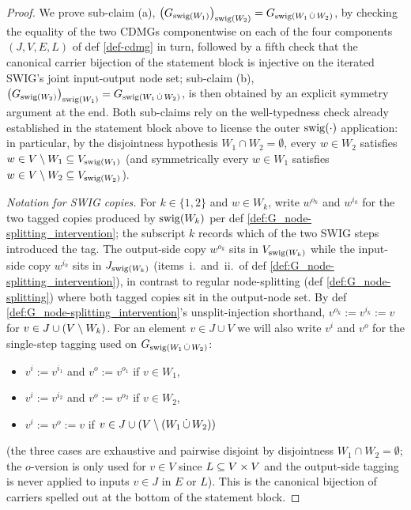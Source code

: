 \documentclass[main]{subfiles}
\begin{document}
\begin{proof}
We prove sub-claim (a), $\left ( G_{\mathrm{swig}(W_1)} \right )_{\mathrm{swig}(W_2)} = G_{\mathrm{swig}(W_1 \,\dot{\cup}\, W_2)}$, by checking the equality of the two CDMGs componentwise on each of the four components $(J, V, E, L)$ of def \ref{def-cdmg} in turn, followed by a fifth check that the canonical carrier bijection of the statement block is injective on the iterated SWIG's joint input-output node set; sub-claim (b), $\left ( G_{\mathrm{swig}(W_2)} \right )_{\mathrm{swig}(W_1)} = G_{\mathrm{swig}(W_1 \,\dot{\cup}\, W_2)}$, is then obtained by an explicit symmetry argument at the end. Both sub-claims rely on the well-typedness check already established in the statement block above to license the outer $\mathrm{swig}(\cdot)$ application: in particular, by the disjointness hypothesis $W_1 \cap W_2 = \emptyset$, every $w \in W_2$ satisfies $w \in V \setminus W_1 \subseteq V_{\mathrm{swig}(W_1)}$ (and symmetrically every $w \in W_1$ satisfies $w \in V \setminus W_2 \subseteq V_{\mathrm{swig}(W_2)}$).

\smallskip\noindent\emph{Notation for SWIG copies.}
For $k \in \{1, 2\}$ and $w \in W_k$, write $w^{o_k}$ and $w^{i_k}$ for the two tagged copies produced by $\mathrm{swig}(W_k)$ per def \ref{def:G_node-splitting_intervention}; the subscript $k$ records which of the two SWIG steps introduced the tag. The output-side copy $w^{o_k}$ sits in $V_{\mathrm{swig}(W_k)}$ while the input-side copy $w^{i_k}$ sits in $J_{\mathrm{swig}(W_k)}$ (items~i.\ and~ii.\ of def \ref{def:G_node-splitting_intervention}), in contrast to regular node-splitting (def \ref{def:G_node-splitting}) where both tagged copies sit in the output-node set. By def \ref{def:G_node-splitting_intervention}'s unsplit-injection shorthand, $v^{o_k} := v^{i_k} := v$ for $v \in J \cup (V \setminus W_k)$. For an element $v \in J \cup V$ we will also write $v^i$ and $v^o$ for the single-step tagging used on $G_{\mathrm{swig}(W_1 \,\dot{\cup}\, W_2)}$:
\begin{itemize}
    \item $v^i := v^{i_1}$ and $v^o := v^{o_1}$ if $v \in W_1$,
    \item $v^i := v^{i_2}$ and $v^o := v^{o_2}$ if $v \in W_2$,
    \item $v^i := v^o := v$ if $v \in J \cup (V \setminus (W_1 \,\dot{\cup}\, W_2))$
\end{itemize}
(the three cases are exhaustive and pairwise disjoint by disjointness $W_1 \cap W_2 = \emptyset$; the $o$-version is only used for $v \in V$ since $L \subseteq V \times V$ and the output-side tagging is never applied to inputs $v \in J$ in $E$ or $L$). This is the canonical bijection of carriers spelled out at the bottom of the statement block.


\end{proof}
\end{document}
